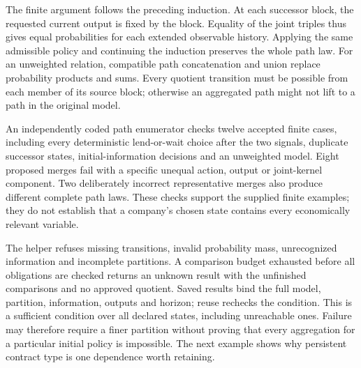The finite argument follows the preceding induction. At each successor block,
the requested current output is fixed by the block. Equality of the joint
triples thus gives equal probabilities for each extended observable history.
Applying the same admissible policy and continuing the induction preserves
the whole path law. For an unweighted relation, compatible path concatenation
and union replace probability products and sums. Every quotient transition
must be possible from each member of its source block; otherwise an aggregated
path might not lift to a path in the original model.

An independently coded path enumerator checks twelve accepted finite cases,
including every deterministic lend-or-wait choice after the two signals,
duplicate successor states, initial-information decisions and an unweighted
model. Eight proposed merges fail with a specific unequal action, output or
joint-kernel component. Two deliberately incorrect representative merges also
produce different complete path laws. These checks support the supplied finite
examples; they do not establish that a company's chosen state contains every
economically relevant variable.

The helper refuses missing transitions, invalid probability mass, unrecognized
information and incomplete partitions. A comparison budget exhausted before
all obligations are checked returns an unknown result with the unfinished
comparisons and no approved quotient. Saved results bind the full model,
partition, information, outputs and horizon; reuse rechecks the condition.
This is a sufficient condition over all declared states, including unreachable
ones. Failure may therefore require a finer partition without proving that
every aggregation for a particular initial policy is impossible. The next
example shows why persistent contract type is one dependence worth retaining.
